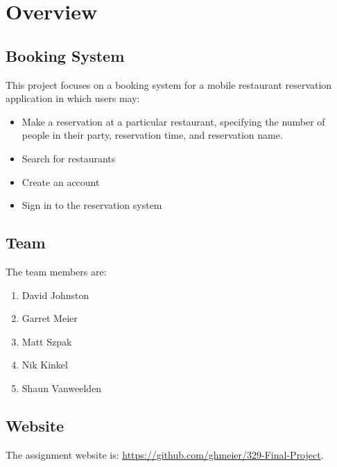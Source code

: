 \chapter{Overview}

\section{Booking System}

This project focuses on a booking system for a mobile restaurant reservation 
application in which users may:

\begin{itemize}
    \item Make a reservation at a particular restaurant, specifying the number
          of people in their party, reservation time, and reservation name.
    \item Search for restaurants
    \item Create an account
    \item Sign in to the reservation system
\end{itemize}

\section{Team}

The team members are:

\begin{enumerate}
    \item David Johnston
    \item Garret Meier
    \item Matt Szpak
    \item Nik Kinkel
    \item Shaun Vanweelden
\end{enumerate}

\section{Website}

The assignment website is: \url{https://github.com/ghmeier/329-Final-Project}.
